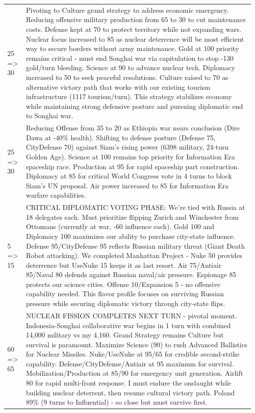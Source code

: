\begin{longtable}{p{}p{}}
25 => 30 & Pivoting to Culture grand strategy to address economic emergency. Reducing offensive military production from 65 to 30 to cut maintenance costs. Defense kept at 70 to protect territory while not expanding wars. Nuclear focus increased to 85 as nuclear deterrence will be most efficient way to secure borders without army maintenance. Gold at 100 priority remains critical - must end Songhai war via capitulation to stop -130 gold/turn bleeding. Science at 90 to advance nuclear tech. Diplomacy increased to 50 to seek peaceful resolutions. Culture raised to 70 as alternative victory path that works with our existing tourism infrastructure (1117 tourism/turn). This strategy stabilizes economy while maintaining strong defensive posture and pursuing diplomatic end to Songhai war. \\
25 => 30 & Reducing Offense from 35 to 20 as Ethiopia war nears conclusion (Dire Dawa at -40\% health). Shifting to defense posture (Defense 75, CityDefense 70) against Siam's rising power (6398 military, 24-turn Golden Age). Science at 100 remains top priority for Information Era spaceship race. Production at 95 for rapid spaceship part construction. Diplomacy at 85 for critical World Congress vote in 4 turns to block Siam's UN proposal. Air power increased to 85 for Information Era warfare capabilities. \\
5 => 15 & CRITICAL DIPLOMATIC VOTING PHASE: We're tied with Russia at 18 delegates each. Must prioritize flipping Zurich and Winchester from Ottomans (currently at war, -60 influence each). Gold 100 and Diplomacy 100 maximizes our ability to purchase city-state influence. Defense 95/CityDefense 95 reflects Russian military threat (Giant Death Robot attacking). We completed Manhattan Project - Nuke 50 provides deterrence but UseNuke 15 keeps it as last resort. Air 75/Antiair 85/Naval 80 defends against Russian naval/air pressure. Espionage 85 protects our science cities. Offense 10/Expansion 5 - no offensive capability needed. This flavor profile focuses on surviving Russian pressure while securing diplomatic victory through city-state flips. \\
60 => 65 & NUCLEAR FISSION COMPLETES NEXT TURN - pivotal moment. Indonesia-Songhai collaborative war begins in 1 turn with combined 14,000 military vs my 4,160. Grand Strategy remains Culture but survival is paramount. Maximize Science (90) to rush Advanced Ballistics for Nuclear Missiles. Nuke/UseNuke at 95/65 for credible second-strike capability. Defense/CityDefense/Antiair at 95 maximum for survival. Mobilization/Production at 85/90 for emergency unit generation. Airlift 80 for rapid multi-front response. I must endure the onslaught while building nuclear deterrent, then resume cultural victory path. Poland 89\% (9 turns to Influential) - so close but must survive first. \\

\end{longtable}
